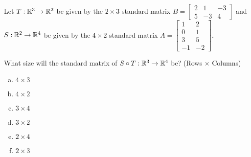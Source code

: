 \begin{activity}{2}
Let \(T: \mathbb{R}^3 \rightarrow \mathbb{R}^2\) be given by the \(2\times 3\) standard matrix \(B=\begin{bmatrix} 2 & 1 & -3 \\ 5 & -3 & 4 \end{bmatrix}\) and \(S: \mathbb{R}^2 \rightarrow \mathbb{R}^4\) be given by the \(4\times 2\) standard matrix \(A=\begin{bmatrix} 1 & 2 \\ 0 & 1 \\ 3 & 5 \\ -1 & -2 \end{bmatrix}\).

What size will the standard matrix of \(S \circ T:\mathbb{R}^3\to\mathbb{R}^4\) be?
(Rows \(\times\) Columns)
\begin{multicols}{3}
\begin{enumerate}[(a)]
\item \(4 \times 3\)
\item \(4 \times 2\)
\item \(3 \times 4\)
\item \(3 \times 2\)
\item \(2 \times 4\)
\item \(2 \times 3\)
\end{enumerate}
\end{multicols}
\end{activity}

